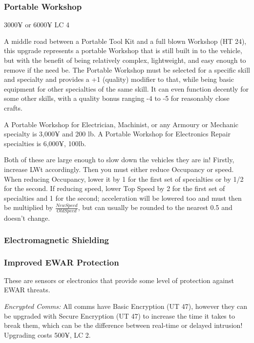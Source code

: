 \begin{multicols*}{2}
	\subsubsection{Portable Workshop}
	3000¥ or 6000¥ LC 4
	
	A middle road between a Portable Tool Kit and a full blown Workshop (HT 24), this upgrade represents a portable Workshop that is still built in to the vehicle, but with the benefit of being relatively complex, lightweight, and easy enough to remove if the need be. The Portable Workshop must be selected for a specific skill and specialty and provides a +1 (quality) modifier to that, while being basic equipment for other specialties of the same skill. It can even function decently for some other skills, with a quality bonus ranging -4 to -5 for reasonably close crafts.
	
	A Portable Workshop for Electrician, Machinist, or any Armoury or Mechanic specialty is 3,000¥ and 200 lb. A Portable Workshop for Electronics Repair specialties is 6,000¥, 100lb.
	
	Both of these are large enough to slow down the vehicles they are in! Firstly, increase LWt accordingly. Then you must either reduce Occupancy or speed. When reducing Occupancy, lower it by 1 for the first set of specialties or by 1/2 for the second. If reducing speed, lower Top Speed by 2 for the first set of specialties and 1 for the second; acceleration will be lowered too and must then be multiplied by $\frac{New Speed}{Old Speed}$, but can usually be rounded to the nearest 0.5 and doesn't change.
	
	\subsubsection{Electromagnetic Shielding}
	
	
	\subsubsection{Improved EWAR Protection}
	
	These are sensors or electronics that provide some level of protection against EWAR threats.
	
	\textit{Encrypted Comms:} All comms have Basic Encryption (UT 47), however they can be upgraded with Secure Encryption (UT 47) to increase the time it takes to break them, which can be the difference between real-time or delayed intrusion! Upgrading costs 500¥, LC 2.
	

\end{multicols*}
